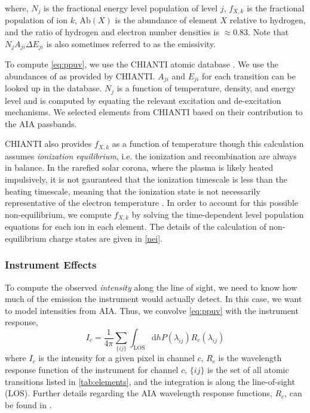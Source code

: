 where, $N_j$ is the fractional energy level population of level $j$, $f_{X,k}$ is the fractional population of ion $k$, $\mathrm{Ab}(X)$ is the abundance of element $X$ relative to hydrogen, and the ratio of hydrogen and electron number densities is $\approx0.83$. Note that $N_j A_{ji} \Delta E_{ji}$ is also sometimes referred to as the emissivity.

To compute \autoref{eq:ppuv}, we use the CHIANTI atomic database \citep{dere_chianti_1997,young_chianti_2016}. We use the abundances of \citet{feldman_potential_1992} as provided by CHIANTI. $A_{ji}$ and $E_{ji}$ for each transition can be looked up in the database. $N_j$ is a function of temperature, density, and energy level and is computed by equating the relevant excitation and de-excitation mechanisms. We selected elements from CHIANTI based on their contribution to the AIA passbands.

CHIANTI also provides $f_{X,k}$ as a function of temperature though this calculation assumes \textit{ionization equilibrium}, i.e. the ionization and recombination are always in balance. In the rarefied solar corona, where the plasma is likely heated impulsively, it is not gauranteed that the ionization timescale is less than the heating timescale, meaning that the ionization state is not necessarily representative of the electron temperature \citep{bradshaw_explosive_2006,reale_nonequilibrium_2008,bradshaw_numerical_2009}. In order to account for this possible non-equilibrium, we compute $f_{X,k}$ by solving the time-dependent level population equations for each ion in each element. The details of the calculation of non-equilibrium charge states are given in \autoref{nei}.

\subsubsection{Instrument Effects}\label{instrument}

To compute the observed \textit{intensity} along the line of sight, we need to know how much of the emission the instrument would actually detect. In this case, we want to model intensities from AIA. Thus, we convolve \autoref{eq:ppuv} with the instrument response,
\begin{equation}\label{eq:intensity}
    I_c = \frac{1}{4\pi}\sum_{\{ij\}}\int_{\text{LOS}}\mathrm{d}hP(\lambda_{ij})R_c(\lambda_{ij})
\end{equation}
where $I_c$ is the intensity for a given pixel in channel $c$, $R_c$ is the wavelength response function of the instrument for channel $c$, $\{ij\}$ is the set of all atomic transitions listed in \autoref{tab:elements}, and the integration is along the line-of-sight (LOS). Further details regarding the AIA wavelength response functions, $R_c$, can be found in \citet{boerner_initial_2012}.

